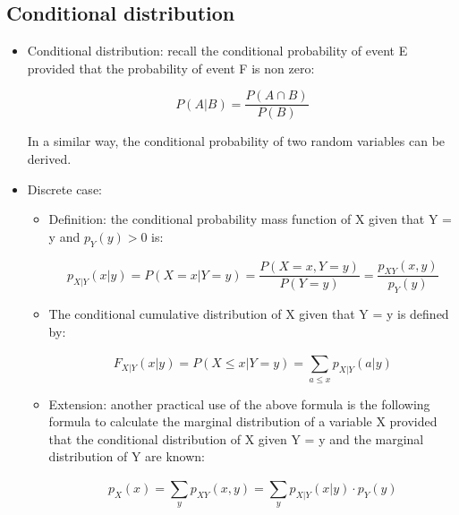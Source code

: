 \documentclass[12pt]{report}
\renewcommand{\_}{\kern-1.5pt\textunderscore\kern-1.5pt}
\begin{document}
\subsection*{Conditional distribution}
\begin{itemize}
	\item Conditional distribution: recall the conditional probability of event E provided that the probability of event F is non zero:\par

 \[ P \left( A \vert B \right) =\frac{P \left( A \cap B \right) }{P \left( B \right) } \] \par

In a similar way, the conditional probability of two random variables can be derived.\par

	\item Discrete case: \par

\begin{itemize}
	\item Definition: the conditional probability mass function of X given that Y = y and  \( p_{Y} \left( y \right) >0 \)  is:\par

 \[ p_{X \vert Y} \left( x \vert y \right) = P \left( X=x \vert Y=y \right) =\frac{P \left( X=x,Y=y \right) }{P \left( Y=y \right) }=\frac{p_{XY} \left( x,y \right) }{p_{Y} \left( y \right) } \] \par

	\item The conditional cumulative distribution of X given that Y = y is defined by:\par

 \[ F_{X \vert Y} \left( x \vert y \right) = P \left( X \leq x \vert Y=y \right) = \sum _{a \leq x}^{}p_{X \vert Y} \left( a \vert y \right)  \] \par

	\item Extension: another practical use of the above formula is the following formula to calculate the marginal distribution of a variable X provided that the conditional distribution of X given Y = y and the marginal distribution of Y are known:\par

 \[ p_{X} \left( x \right) = \sum _{y}^{}p_{XY} \left( x,y \right) = \sum _{y}^{}p_{X \vert Y} \left( x \vert y \right)  \cdot p_{Y} \left( y \right)  \] \par


\end{itemize}
\end{itemize}
\end{document}

